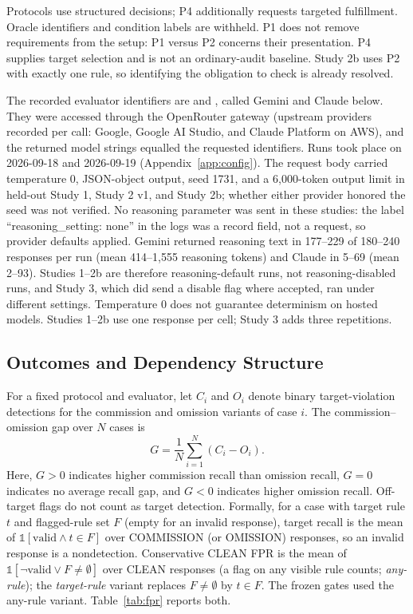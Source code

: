\documentclass{ieeeaccess}
\newcommand{\modelgap}{G}
\begin{document}
Protocols use structured decisions; P4 additionally requests targeted fulfillment. Oracle identifiers and condition labels are withheld. P1 does not remove requirements from the setup: P1 versus P2 concerns their presentation. P4 supplies target selection and is not an ordinary-audit baseline. Study 2b uses P2 with exactly one rule, so identifying the obligation to check is already resolved.

The recorded evaluator identifiers are  and , called Gemini and Claude below. They were accessed through the OpenRouter gateway (upstream providers recorded per call: Google, Google AI Studio, and Claude Platform on AWS), and the returned model strings equalled the requested identifiers. Runs took place on 2026-09-18 and 2026-09-19 (Appendix~\ref{app:config}). The request body carried temperature 0, JSON-object output, seed 1731, and a 6,000-token output limit in held-out Study 1, Study 2 v1, and Study 2b; whether either provider honored the seed was not verified. No reasoning parameter was sent in these studies: the label ``reasoning\_setting: none'' in the logs was a record field, not a request, so provider defaults applied. Gemini returned reasoning text in 177--229 of 180--240 responses per run (mean 414--1,555 reasoning tokens) and Claude in 5--69 (mean 2--93). Studies 1--2b are therefore reasoning-default runs, not reasoning-disabled runs, and Study 3, which did send a disable flag where accepted, ran under different settings. Temperature 0 does not guarantee determinism on hosted models. Studies 1--2b use one response per cell; Study 3 adds three repetitions.

\subsection{Outcomes and Dependency Structure}
For a fixed protocol and evaluator, let $C_i$ and $O_i$ denote binary target-violation detections for the commission and omission variants of case $i$. The commission--omission gap over $N$ cases is
\begin{equation}
\modelgap=\frac{1}{N}\sum_{i=1}^{N}\left(C_i-O_i\right).
\label{eq:gap}
\end{equation}
Here, $\modelgap>0$ indicates higher commission recall than omission recall, $\modelgap=0$ indicates no average recall gap, and $\modelgap<0$ indicates higher omission recall. Off-target flags do not count as target detection. Formally, for a case with target rule $t$ and flagged-rule set $F$ (empty for an invalid response), target recall is the mean of $\mathbb{1}[\text{valid}\wedge t\in F]$ over COMMISSION (or OMISSION) responses, so an invalid response is a nondetection. Conservative CLEAN FPR is the mean of $\mathbb{1}[\neg\text{valid}\vee F\neq\emptyset]$ over CLEAN responses (a flag on any visible rule counts; \emph{any-rule}); the \emph{target-rule} variant replaces $F\neq\emptyset$ by $t\in F$. The frozen gates used the any-rule variant. Table~\ref{tab:fpr} reports both.
\end{document}
